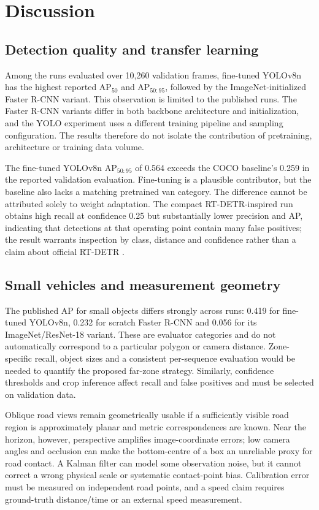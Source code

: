 \section{Discussion}
\label{sec:discussion}
\subsection{Detection quality and transfer learning}
Among the runs evaluated over 10,260 validation frames, fine-tuned YOLOv8n has the highest reported AP$_{50}$ and AP$_{50:95}$, followed by the ImageNet-initialized Faster R-CNN variant. This observation is limited to the published runs. The Faster R-CNN variants differ in both backbone architecture and initialization, and the YOLO experiment uses a different training pipeline and sampling configuration. The results therefore do not isolate the contribution of pretraining, architecture or training data volume.

The fine-tuned YOLOv8n AP$_{50:95}$ of 0.564 exceeds the COCO baseline's 0.259 in the reported validation evaluation. Fine-tuning is a plausible contributor, but the baseline also lacks a matching pretrained van category. The difference cannot be attributed solely to weight adaptation. The compact RT-DETR-inspired run obtains high recall at confidence 0.25 but substantially lower precision and AP, indicating that detections at that operating point contain many false positives; the result warrants inspection by class, distance and confidence rather than a claim about official RT-DETR \cite{comparison}.

\subsection{Small vehicles and measurement geometry}
The published AP for small objects differs strongly across runs: 0.419 for fine-tuned YOLOv8n, 0.232 for scratch Faster R-CNN and 0.056 for its ImageNet/ResNet-18 variant. These are evaluator categories and do not automatically correspond to a particular polygon or camera distance. Zone-specific recall, object sizes and a consistent per-sequence evaluation would be needed to quantify the proposed far-zone strategy. Similarly, confidence thresholds and crop inference affect recall and false positives and must be selected on validation data.

Oblique road views remain geometrically usable if a sufficiently visible road region is approximately planar and metric correspondences are known. Near the horizon, however, perspective amplifies image-coordinate errors; low camera angles and occlusion can make the bottom-centre of a box an unreliable proxy for road contact. A Kalman filter can model some observation noise, but it cannot correct a wrong physical scale or systematic contact-point bias. Calibration error must be measured on independent road points, and a speed claim requires ground-truth distance/time or an external speed measurement.

